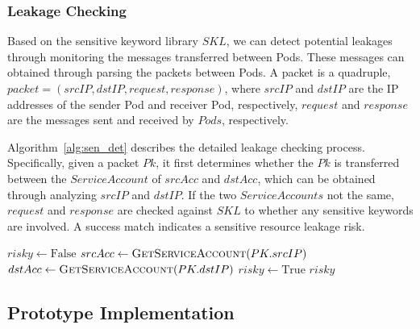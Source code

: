 \documentclass[conference]{IEEEtran}
\theoremstyle{definition}
\begin{document}
\subsubsection{Leakage Checking}
Based on the sensitive keyword library $SKL$, we can detect potential leakages through monitoring the messages transferred between Pods. These messages can obtained through parsing the packets between Pods. A packet is a quadruple, $packet = (srcIP, dstIP, request, response)$, where $srcIP$ and $dstIP$ are the IP addresses of the sender Pod and receiver Pod, respectively, $request$ and $response$ are the messages sent and received by $Pods$, respectively.

Algorithm~\ref{alg:sen_det} describes the detailed leakage checking process. Specifically, given a packet $Pk$, it first determines whether the $Pk$ is transferred between the $ServiceAccount$ of $srcAcc$ and $dstAcc$, which can be obtained through analyzing $srcIP$ and $dstIP$. If the two $ServiceAccounts$ not the same, $request$ and $response$ are checked against $SKL$ to whether any sensitive keywords are involved. A success match indicates a sensitive resource leakage risk.

\begin{algorithm}[!htb]
\caption{Leakage Checking}
\label{alg:sen_det}
\begin{algorithmic}[1]
    \State $risky \gets \text{False}$
    \State $srcAcc \gets \Call{GetServiceAccount}{PK.srcIP}$
    \State $dstAcc \gets \Call{GetServiceAccount}{PK.dstIP}$
            \State $risky \gets \text{True}$
        \EndIf
    \EndIf
    \State \Return $risky$  
\end{algorithmic}
\end{algorithm}
\vspace{-6pt}

\subsection{Prototype Implementation} 
\label{sec:impl}
\end{document}
